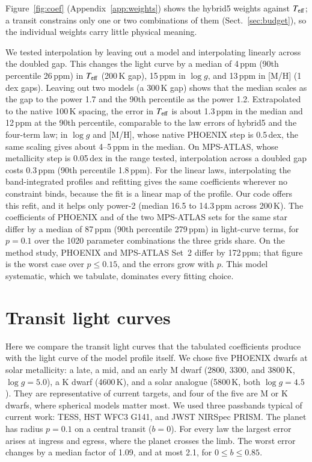\documentclass{aa}
\newcommand{\ppm}{\,\textrm{ppm}}
\newcommand{\teff}{T_{\rm eff}}
\begin{document}
Figure~\ref{fig:coef} (Appendix~\ref{app:weights}) shows the hybrid5
weights against $\teff$; a transit constrains only one or two combinations of
them (Sect.~\ref{sec:budget}), so the individual weights carry little
physical meaning.

We tested interpolation by leaving out a model and interpolating linearly
across the doubled gap. This changes the light curve by a median of
4\ppm{} (90th percentile 26\ppm) in $\teff$ (200\,K gap), 15\ppm{} in
$\log g$, and 13\ppm{} in [M/H] (1\,dex gaps). Leaving out two models
(a 300\,K gap) shows that the median scales as the gap to the power 1.7 and
the 90th percentile as the power 1.2. Extrapolated to the native 100\,K
spacing, the error in $\teff$ is about 1.3\ppm{} in the median and 12\ppm{} at
the 90th percentile, comparable to the law errors of hybrid5 and the four-term
law; in $\log g$ and [M/H], whose native PHOENIX step is 0.5\,dex, the same
scaling gives about 4--5\ppm{} in the median. On MPS-ATLAS, whose metallicity
step is 0.05\,dex in the range tested, interpolation across a doubled gap
costs 0.3\ppm{} (90th percentile 1.8\ppm). For the linear laws, interpolating the
band-integrated profiles and refitting gives the same coefficients wherever no
constraint binds, because the fit is a linear map of the profile. Our code
offers this refit, and it helps only power-2 (median 16.5 to 14.3\ppm{}
across 200\,K). The coefficients of PHOENIX and of the two MPS-ATLAS sets for
the same star differ by a median of 87\ppm{} (90th percentile
279\ppm) in light-curve terms, for $p=0.1$ over the 1020 parameter
combinations the three grids share. On the method study, PHOENIX and
MPS-ATLAS Set~2 differ by 172\ppm{}; that figure is the worst case over
$p\le0.15$, and the errors grow with $p$. This model systematic, which we
tabulate, dominates every fitting choice.

\section{Transit light curves}\label{sec:lc}
Here we compare the transit light curves that the tabulated coefficients
produce with the light curve of the model profile itself. We chose five
PHOENIX dwarfs at solar metallicity: a late, a mid, and an early M dwarf
(2800, 3300, and 3800\,K, $\log g=5.0$), a K dwarf (4600\,K), and a solar
analogue (5800\,K, both $\log g=4.5$). They are representative of current
targets, and four of the five are M or K dwarfs, where spherical models matter
most. We used three passbands typical of current work: TESS, HST WFC3 G141,
and JWST NIRSpec PRISM. The planet has radius $p=0.1$ on a central transit
($b=0$). For every law the largest error arises at ingress and egress, where
the planet crosses the limb. The worst error changes by a median factor of
1.09, and at most 2.1, for $0\le b\le0.85$.
\end{document}
